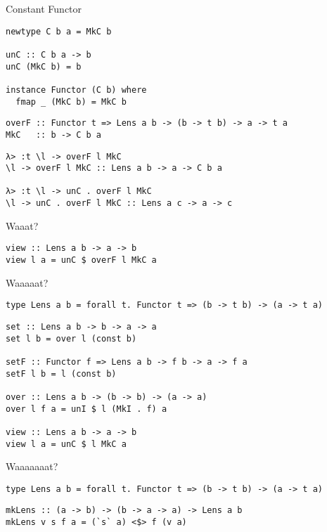 \documentclass[presentation,aspectratio=169,8pt]{beamer}
\begin{document}
\begin{frame}[label={sec:org6f9650c},fragile]{Constant Functor}
 \begin{verbatim}
newtype C b a = MkC b

unC :: C b a -> b
unC (MkC b) = b

instance Functor (C b) where
  fmap _ (MkC b) = MkC b
\end{verbatim}

\pause

\begin{verbatim}
overF :: Functor t => Lens a b -> (b -> t b) -> a -> t a
MkC   :: b -> C b a
\end{verbatim}

\pause

\begin{verbatim}
λ> :t \l -> overF l MkC
\l -> overF l MkC :: Lens a b -> a -> C b a

λ> :t \l -> unC . overF l MkC
\l -> unC . overF l MkC :: Lens a c -> a -> c
\end{verbatim}
\end{frame}

\begin{frame}[label={sec:org02dc198},fragile]{Waaat?}
 \begin{verbatim}
view :: Lens a b -> a -> b
view l a = unC $ overF l MkC a
\end{verbatim}
\end{frame}

\begin{frame}[label={sec:org46eae7e},fragile]{Waaaaat?}
 \begin{verbatim}
type Lens a b = forall t. Functor t => (b -> t b) -> (a -> t a)
\end{verbatim}

\pause

\begin{verbatim}
set :: Lens a b -> b -> a -> a
set l b = over l (const b)

setF :: Functor f => Lens a b -> f b -> a -> f a
setF l b = l (const b)

over :: Lens a b -> (b -> b) -> (a -> a)
over l f a = unI $ l (MkI . f) a

view :: Lens a b -> a -> b
view l a = unC $ l MkC a
\end{verbatim}
\end{frame}

\begin{frame}[label={sec:orga0dd936},fragile]{Waaaaaaat?}
 \begin{verbatim}
type Lens a b = forall t. Functor t => (b -> t b) -> (a -> t a)
\end{verbatim}

\pause

\begin{verbatim}
mkLens :: (a -> b) -> (b -> a -> a) -> Lens a b
mkLens v s f a = (`s` a) <$> f (v a)
\end{verbatim}
\end{frame}
\end{document}
